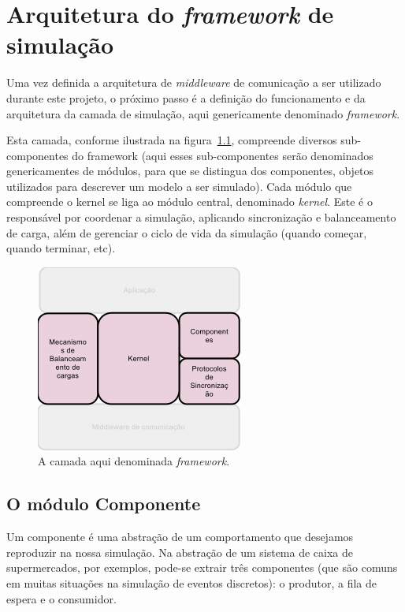\chapter{Arquitetura do \textit{framework} de simulação}

Uma vez definida a arquitetura de \textit{middleware} de comunicação a ser utilizado durante este projeto, o próximo passo é a definição do funcionamento e da arquitetura da camada de simulação, aqui genericamente denominado \textit{framework}.

Esta camada, conforme ilustrada na figura~\ref{fig:camada_central}, compreende diversos sub-componentes do framework (aqui esses sub-componentes serão denominados genericamentes de módulos, para que se distingua dos componentes, objetos utilizados para descrever um modelo a ser simulado). Cada módulo que compreende o kernel se liga ao módulo central, denominado \textit{kernel}. Este é o responsável por coordenar a simulação, aplicando sincronização e balanceamento de carga, além de gerenciar o ciclo de vida da simulação (quando começar, quando terminar, etc).

\begin{figure}
  \centerline{\includegraphics{camada_framework.png}}
  \caption{A camada aqui denominada \textit{framework}.}
\label{fig:camada_central}
\end{figure}

\section{O módulo Componente}

Um componente é uma abstração de um comportamento que desejamos reproduzir na nossa simulação. Na abstração de um sistema de caixa de supermercados, por exemplos, pode-se extrair três componentes (que são comuns em muitas situações na simulação de eventos discretos): o produtor, a fila de espera e o consumidor.

